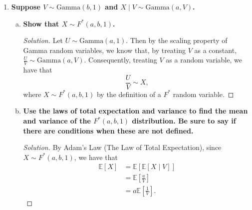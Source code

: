 \documentclass[11pt]{article}
\newenvironment{solution}
  {\renewcommand\qedsymbol{$\blacksquare$}\begin{proof}[Solution]}
  {\end{proof}}
\begin{document}
\begin{enumerate}
\begin{enumerate}[a)]
\begin{solution}
		Similarly, note that
		\[
			\mathbb{E}\left[Y^2 \right] = \mathbb{E}\left[\frac{1}{X^2} \right] = \int_0^{\infty} \frac{1}{x^2} \frac{\lambda^\alpha}{\Gamma(\alpha)} x^{\alpha - 1} e^{-\lambda x} \, dx.
		\]
		Simplifying, we find that
		\begin{align*}
			\mathbb{E}\left[Y \right] &= \int_0^{\infty} \frac{1}{x^2} \frac{\lambda^\alpha}{\Gamma(\alpha)} x^{\alpha - 1} e^{-\lambda x} \, dx \\
			&= \int_0^{\infty} \frac{\lambda^\alpha}{\Gamma(\alpha)} x^{\alpha - 3} e^{-\lambda x} \, dx \\
			&= \frac{\Gamma(\alpha - 2)\lambda^2}{\Gamma(\alpha)} \int_0^{\infty} \frac{\lambda^{\alpha - 2}}{\Gamma(\alpha - 2)} x^{(\alpha - 2) -  1} e^{-\lambda x} \, dx
		\end{align*}
		Once again, the integrand integrates to $1$ as it is the pdf of a $\mathrm{Gamma}(\alpha - 2, \lambda)$ variable. Thus, for $\alpha > 2$,
		\[
			\boxed{\mathbb{E}\left[Y^2 \right] = \frac{\Gamma(\alpha - 2)\lambda^2}{\Gamma(\alpha)} = \frac{\lambda^2}{(\alpha - 1)(\alpha - 2)}}.
		\]
		These results both match our previous integration-by-recognition calculations.
	\end{solution}

	\end{enumerate}

	\newpage

	\item \textbf{Suppose $V \sim \mathrm{Gamma}(b, 1)$ and $X \mid V \sim \mathrm{Gamma}(a, V)$.}
	
	\begin{enumerate}[a)]
	  \item \textbf{Show that $X \sim F^*(a, b, 1)$.}
	  
		\begin{solution}
		Let $U \sim \mathrm{Gamma}(a, 1)$. Then by the scaling property of Gamma random variables, we know that, by treating $V$ as a constant, $\frac{U}{V} \sim \mathrm{Gamma}(a, V)$. 
		Consequently, treating $V$ as a random variable, we have that 
		\[
			\frac{U}{V} \sim X,
		\]
		where $X \sim F^*(a, b, 1)$ by the definition of a $F^*$ random variable.
		\end{solution}
	  \item \textbf{Use the laws of total expectation and variance to find the mean and variance of the $F^*(a, b, 1)$ distribution. Be sure to say if there are conditions when these are not defined.}
	
		\begin{solution}
			By Adam's Law (The Law of Total Expectation), since $X \sim F^*(a, b, 1)$, we have that
			\begin{align*}
				\mathbb{E}\left[X \right] &= \mathbb{E}\left[ \mathbb{E}\left[X \mid V \right]  \right] \\
				&= \mathbb{E}\left[ \frac{a}{V} \right] \\
				&= a \mathbb{E}\left[\frac{1}{V} \right].
			\end{align*}


\end{solution}
\end{enumerate}
\end{enumerate}
\end{document}
